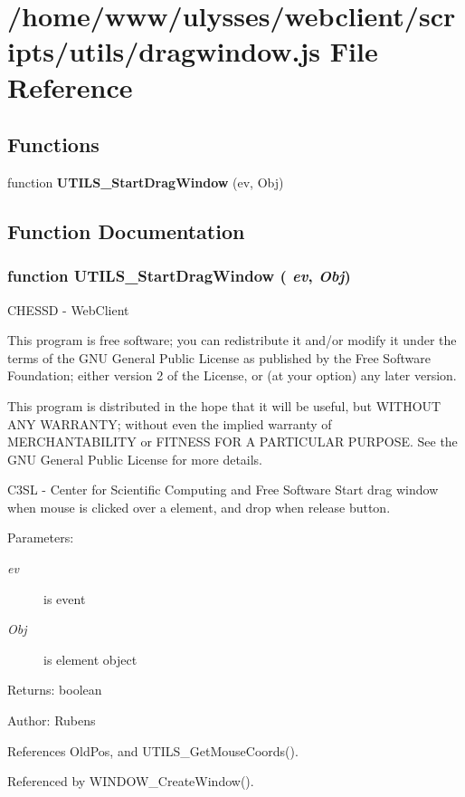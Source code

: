 \section{/home/www/ulysses/webclient/scripts/utils/dragwindow.js File Reference}
\label{dragwindow_8js}
\subsection*{Functions}
\begin{CompactItemize}
\item 
function {\bf UTILS\_\-StartDragWindow} (ev, Obj)
\end{CompactItemize}


\subsection{Function Documentation}
\subsubsection{\setlength{\rightskip}{0pt plus 5cm}function UTILS\_\-StartDragWindow ( {\em ev}, \/   {\em Obj})}\label{dragwindow_8js_936119f257d49c89f33d5e50e71bf48f}


CHESSD - WebClient

This program is free software; you can redistribute it and/or modify it under the terms of the GNU General Public License as published by the Free Software Foundation; either version 2 of the License, or (at your option) any later version.

This program is distributed in the hope that it will be useful, but WITHOUT ANY WARRANTY; without even the implied warranty of MERCHANTABILITY or FITNESS FOR A PARTICULAR PURPOSE. See the GNU General Public License for more details.

C3SL - Center for Scientific Computing and Free Software Start drag window when mouse is clicked over a element, and drop when release button.

\begin{Desc}
\item[Parameters:]
\begin{description}
\item[{\em ev}]is event \item[{\em Obj}]is element object \end{description}
\end{Desc}
\begin{Desc}
\item[Returns:]boolean \end{Desc}
\begin{Desc}
\item[Author:]Rubens \end{Desc}


References OldPos, and UTILS\_\-GetMouseCoords().

Referenced by WINDOW\_\-CreateWindow().